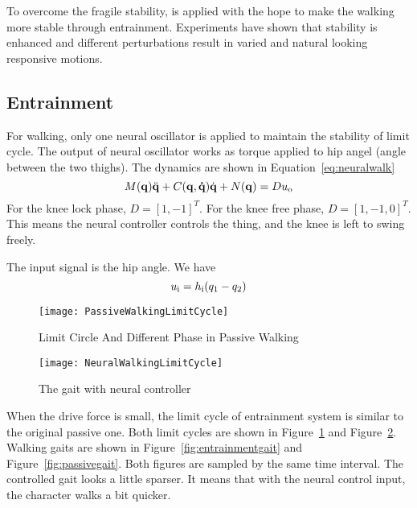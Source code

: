To overcome the fragile stability, \cpg is applied with the hope to make the walking more stable through entrainment.
Experiments have shown that stability is enhanced and different perturbations result in varied and natural looking responsive motions.




\subsection{Entrainment}
For walking, only one neural oscillator is applied to maintain the stability of limit cycle.
The output of neural oscillator works as torque applied to hip angel (angle between the two thighs).
The dynamics are shown in Equation~\ref{eq:neuralwalk}
\begin{equation}
\label{eq:neuralwalk}
M(\mathbf{q}) \ddot{\mathbf{q}} + C(\mathbf{q,\dot{q}})\dot{\mathbf{q}} + N(\mathbf{q}) = Du_{\mathrm{o}}
\end{equation}
For the knee lock phase, $D=[1,-1]^T$.
For the knee free phase, $D=[1,-1,0]^T$.
This means the neural controller controls the thing, and the knee is left to swing freely.

The input signal is the hip angle.
We have 
\[
	u_{\mathrm{i}}=h_{\mathrm{i}}(q_1-q_2)
\]





\begin{figure}[!htbp]
  \begin{center}
    \texttt{[image: PassiveWalkingLimitCycle]}
    \caption{Limit Circle And Different Phase in Passive Walking}
    \label{fig:passivegaitlimitcycle}
\end{center}
\end{figure}


\begin{figure}[!htbp]
  \begin{center}
      \texttt{[image: NeuralWalkingLimitCycle]}
    \caption{The gait with neural controller}
    \label{fig:entrainmentgaitlimitcyle}
\end{center}
\end{figure}
When the drive force is small, the limit cycle of entrainment system is similar to the original passive one.
Both limit cycles are shown in Figure~\ref{fig:passivegaitlimitcycle} and Figure~\ref{fig:entrainmentgaitlimitcyle}.
Walking gaits are shown in Figure~\ref{fig:entrainmentgait} and Figure~\ref{fig:passivegait}.
Both figures are sampled by the same time interval.
The controlled gait looks a little sparser.
It means that with the neural control input, the character walks a bit quicker. 




